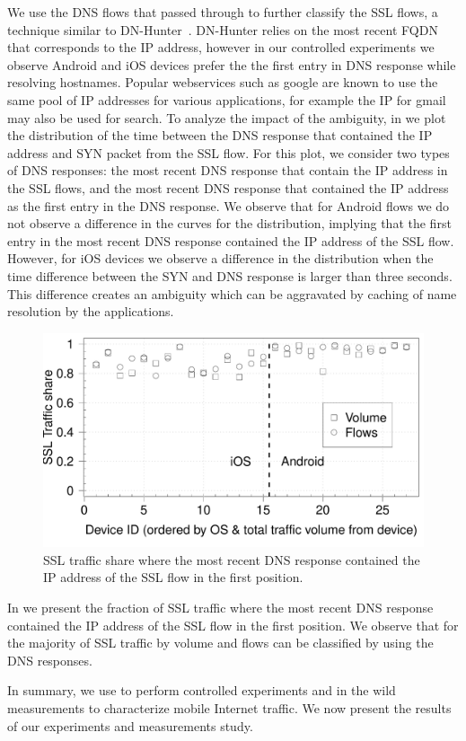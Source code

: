 We use the DNS flows that passed through \platname to further classify the SSL flows, a technique similar to DN-Hunter~\cite{bermudez:dnhunter}.
DN-Hunter relies on the most recent FQDN that corresponds to the IP address, however in our controlled experiments we observe Android and iOS devices prefer the the first entry in DNS response while resolving hostnames.
Popular webservices such as google are known to use the same pool of IP addresses for various applications, for example the IP for gmail may also be used for search. 
To analyze the impact of the ambiguity, in  we plot the distribution of the time between the DNS response that contained the IP address and SYN packet from the SSL flow. 
For this plot, we consider two types of DNS responses: the most recent DNS response that contain the IP address in the SSL flows, and the most recent DNS response that contained the IP address as the first entry in the DNS response. 
We observe that for Android flows we do not observe a difference in the curves for the distribution, implying that the first entry in the most recent DNS response contained the IP address of the SSL flow.
However, for iOS devices we observe a difference in the distribution when the time difference between the SYN and DNS response is larger than three seconds. 
This difference creates an ambiguity which can be aggravated by caching of name resolution by the applications. 

\begin{figure}
\includegraphics[width=\columnwidth]{plots/sslanalysis_samedns_traffic.pdf}
\caption{SSL traffic share where the most recent DNS response contained the IP address of the SSL flow in the first position.}
\label{fig:ssl-classification-app-service}
\end{figure}

In  we present the fraction of SSL traffic where the most recent DNS response contained the IP address of the SSL flow in the first position. 
We observe that for the majority of SSL traffic by volume and flows can be classified by using the DNS responses. 

In summary, we use \platname to perform controlled experiments and in the wild measurements to characterize mobile Internet traffic. 
We now present the results of our experiments and measurements study. 



